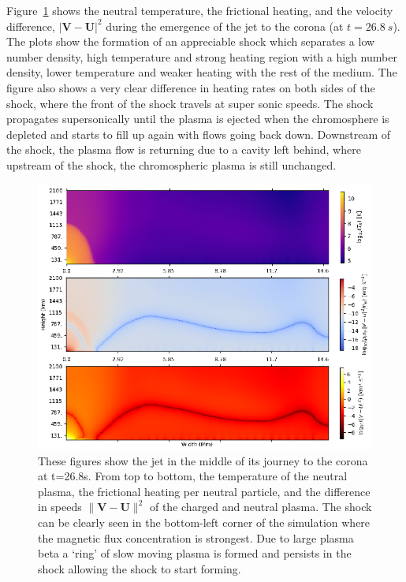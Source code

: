 \documentclass[12pt,upcase]{umlthesis}
\begin{document}
Figure~\ref{fig:midspicule} shows the neutral temperature, the frictional heating, and the velocity difference, $| \textbf{V} - \textbf{U}|^2$ during the emergence of the jet to the corona (at $t=26.8~s$). The plots show the formation of an appreciable shock which separates a low number density, high temperature and strong heating region with a high number density, lower temperature and weaker heating with the rest of the medium. The figure also shows a very clear difference in heating rates on both sides of the shock, where the front of the shock travels at super sonic speeds. The shock propagates supersonically until the plasma is ejected when the chromosphere is depleted and starts to fill up again with flows going back down. Downstream of the shock, the plasma flow is returning due to a cavity left behind, where upstream of the shock, the chromospheric plasma is still unchanged.

\begin{figure}[ht!]
	\centering
    \includegraphics[width=1\textwidth]{images/midspicule.eps}
	\caption{These figures show the jet in the middle of its journey to the corona at t=26.8s. From top to bottom, the temperature of the neutral plasma, the frictional heating per neutral particle, and the difference in speeds $\| \textbf{V} - \textbf{U} \|^2$ of the charged and neutral plasma. The shock can be clearly seen in the bottom-left corner of the simulation where the magnetic flux concentration is strongest. Due to large plasma beta a `ring' of slow moving plasma is formed and persists in the shock allowing the shock to start forming.}\label{fig:midspicule}
\end{figure}
\end{document}
